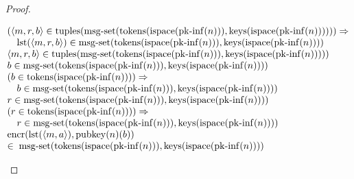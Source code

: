 \documentclass[11pt]{article}
\theoremstyle{plain}
\begin{document}
\begin{proof}
\begin{itemize}[leftmargin=2.8em, itemsep=4pt, parsep=1pt]
\begin{itemize}[leftmargin=2.8em, itemsep=4pt, parsep=1pt]
\begin{equation*}
\begin{array}{@{}l@{}}
\begin{array}{@{}l@{}} (\langle m, r, b \rangle \in \operatorname{tuples}(\operatorname{msg\text{-}set}(\operatorname{tokens}(\operatorname{ispace}(\operatorname{pk\text{-}inf}(n))), \operatorname{keys}(\operatorname{ispace}(\operatorname{pk\text{-}inf}(n)))))) \Rightarrow  \\ \quad \operatorname{lst}(\langle m, r, b \rangle) \in \operatorname{msg\text{-}set}(\operatorname{tokens}(\operatorname{ispace}(\operatorname{pk\text{-}inf}(n))), \operatorname{keys}(\operatorname{ispace}(\operatorname{pk\text{-}inf}(n)))) \end{array} \\
\langle m, r, b \rangle \in \operatorname{tuples}(\operatorname{msg\text{-}set}(\operatorname{tokens}(\operatorname{ispace}(\operatorname{pk\text{-}inf}(n))), \operatorname{keys}(\operatorname{ispace}(\operatorname{pk\text{-}inf}(n))))) \\
b \in \operatorname{msg\text{-}set}(\operatorname{tokens}(\operatorname{ispace}(\operatorname{pk\text{-}inf}(n))), \operatorname{keys}(\operatorname{ispace}(\operatorname{pk\text{-}inf}(n)))) \\
\begin{array}{@{}l@{}} (b \in \operatorname{tokens}(\operatorname{ispace}(\operatorname{pk\text{-}inf}(n)))) \Rightarrow  \\ \quad b \in \operatorname{msg\text{-}set}(\operatorname{tokens}(\operatorname{ispace}(\operatorname{pk\text{-}inf}(n))), \operatorname{keys}(\operatorname{ispace}(\operatorname{pk\text{-}inf}(n)))) \end{array} \\
r \in \operatorname{msg\text{-}set}(\operatorname{tokens}(\operatorname{ispace}(\operatorname{pk\text{-}inf}(n))), \operatorname{keys}(\operatorname{ispace}(\operatorname{pk\text{-}inf}(n)))) \\
\begin{array}{@{}l@{}} (r \in \operatorname{tokens}(\operatorname{ispace}(\operatorname{pk\text{-}inf}(n)))) \Rightarrow  \\ \quad r \in \operatorname{msg\text{-}set}(\operatorname{tokens}(\operatorname{ispace}(\operatorname{pk\text{-}inf}(n))), \operatorname{keys}(\operatorname{ispace}(\operatorname{pk\text{-}inf}(n)))) \end{array} \\
\begin{array}{@{}l@{}} \operatorname{encr}(\operatorname{lst}(\langle m, a \rangle), \operatorname{pubkey}(n)(b)) \\ \in\; \operatorname{msg\text{-}set}(\operatorname{tokens}(\operatorname{ispace}(\operatorname{pk\text{-}inf}(n))), \operatorname{keys}(\operatorname{ispace}(\operatorname{pk\text{-}inf}(n)))) \end{array} \\

\end{array}
\end{equation*}
\end{itemize}
\end{itemize}
\end{proof}
\end{document}
